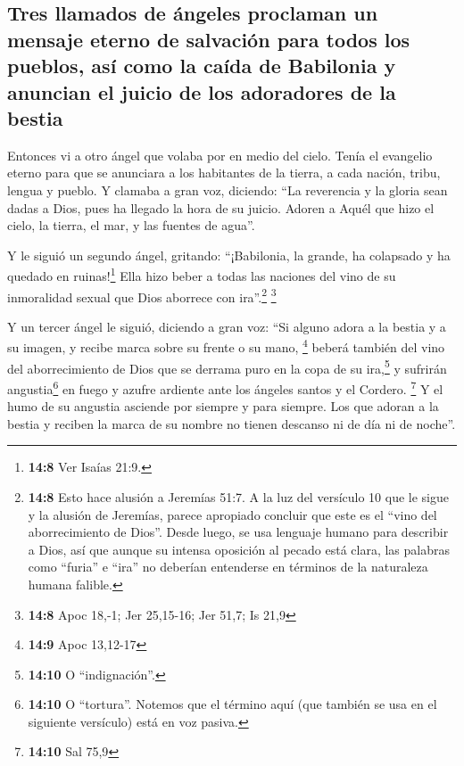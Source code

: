\hypertarget{tres-llamados-de-uxe1ngeles-proclaman-un-mensaje-eterno-de-salvaciuxf3n-para-todos-los-pueblos-asuxed-como-la-cauxedda-de-babilonia-y-anuncian-el-juicio-de-los-adoradores-de-la-bestia}{%
\subsection{Tres llamados de ángeles proclaman un mensaje eterno de
salvación para todos los pueblos, así como la caída de Babilonia y
anuncian el juicio de los adoradores de la
bestia}\label{tres-llamados-de-uxe1ngeles-proclaman-un-mensaje-eterno-de-salvaciuxf3n-para-todos-los-pueblos-asuxed-como-la-cauxedda-de-babilonia-y-anuncian-el-juicio-de-los-adoradores-de-la-bestia}}

 Entonces vi a otro ángel que volaba por en medio del
cielo. Tenía el evangelio eterno para que se anunciara a los habitantes
de la tierra, a cada nación, tribu, lengua y pueblo.  Y
clamaba a gran voz, diciendo: ``La reverencia y la gloria sean dadas a
Dios, pues ha llegado la hora de su juicio. Adoren a Aquél que hizo el
cielo, la tierra, el mar, y las fuentes de agua''.

 Y le siguió un segundo ángel, gritando: ``¡Babilonia, la
grande, ha colapsado y ha quedado en ruinas!\footnote{\textbf{14:8} Ver
  Isaías 21:9.} Ella hizo beber a todas las naciones del vino de su
inmoralidad sexual que Dios aborrece con ira''.\footnote{\textbf{14:8}
  Esto hace alusión a Jeremías 51:7. A la luz del versículo 10 que le
  sigue y la alusión de Jeremías, parece apropiado concluir que este es
  el ``vino del aborrecimiento de Dios''. Desde luego, se usa lenguaje
  humano para describir a Dios, así que aunque su intensa oposición al
  pecado está clara, las palabras como ``furia'' e ``ira'' no deberían
  entenderse en términos de la naturaleza humana falible.} \footnote{\textbf{14:8}
  Apoc 18,-1; Jer 25,15-16; Jer 51,7; Is 21,9}

 Y un tercer ángel le siguió, diciendo a gran voz: ``Si
alguno adora a la bestia y a su imagen, y recibe marca sobre su frente o
su mano, \footnote{\textbf{14:9} Apoc 13,12-17}  beberá
también del vino del aborrecimiento de Dios que se derrama puro en la
copa de su ira,\footnote{\textbf{14:10} O ``indignación''.} y sufrirán
angustia\footnote{\textbf{14:10} O ``tortura''. Notemos que el término
  aquí (que también se usa en el siguiente versículo) está en voz
  pasiva.} en fuego y azufre ardiente ante los ángeles santos y el
Cordero. \footnote{\textbf{14:10} Sal 75,9}  Y el humo de
su angustia asciende por siempre y para siempre. Los que adoran a la
bestia y reciben la marca de su nombre no tienen descanso ni de día ni
de noche''.

